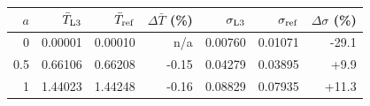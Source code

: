 \begin{tabular}{rrrrrrr}\toprule
$a$ & $\bar T_{\rm L3}$ & $\bar T_{\rm ref}$ & $\Delta\bar T$ (\%) & $\sigma_{\rm L3}$ & $\sigma_{\rm ref}$ & $\Delta\sigma$ (\%)\\\midrule
0 & 0.00001 & 0.00010 & n/a & 0.00760 & 0.01071 & -29.1 \\
0.5 & 0.66106 & 0.66208 & -0.15 & 0.04279 & 0.03895 & +9.9 \\
1 & 1.44023 & 1.44248 & -0.16 & 0.08829 & 0.07935 & +11.3 \\
\bottomrule\end{tabular}

